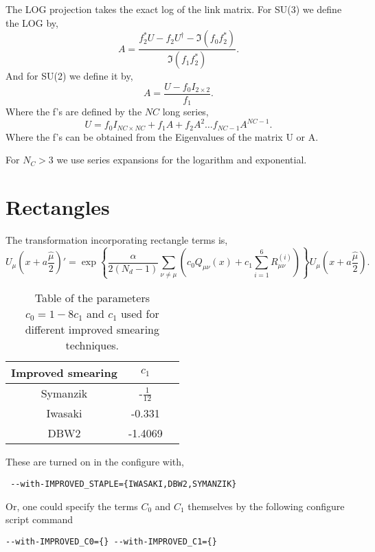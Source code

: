 \documentclass[12pt]{article}
\newcommand{\UMP}{\mbox{$U_\mu\left(x+a\frac{\hat\mu}{2}\right)$}}
\begin{document}
The LOG projection takes the exact log of the link matrix. For SU(3) we define the LOG by,
\begin{equation}\label{chap5:eq:exactlog}
A=\frac{f_2^*U-f_2U^{\dagger}-\Im{\left(f_0 f_2^*\right)}}{\Im{\left(f_1 f_2^*\right)}}.
\end{equation}
And for SU(2) we define it by,
\begin{equation}
A=\frac{U - f_0 I_{2\times2}}{f_1}.
\end{equation}
Where the f's are defined by the $NC$ long series,
\begin{equation}
 U = f_0 I_{NC\times NC} + f_1 A + f_2 A^2 \dots f_{NC-1} A^{NC-1}.
\end{equation}
Where the f's can be obtained from the Eigenvalues of the matrix U or A.

For $N_C > 3$ we use series expansions for the logarithm and exponential.

\section{Rectangles}\label{sec:rec}

The transformation incorporating rectangle terms is,
\begin{equation}
\UMP'=\exp\left\{\frac{\alpha}{2(N_d-1)}\sum_{\nu\neq\mu}\left(c_0 Q_{\mu\nu}(x)
+c_1\sum_{i=1}^{6} R^{(i)}_{\mu\nu}\right) \right\}\UMP.
\end{equation}

\begin{table}[h]
\begin{center}
\begin{tabular}{|c|c|c|}
\hline
Improved smearing & $c_1$ \\
\hline
\rule{0pt}{2.6ex}
Symanzik & -$\frac{1}{12}$ \\
Iwasaki & -0.331 \\
DBW2 & -1.4069 \\
\hline
\end{tabular}
\caption{Table of the parameters $c_0=1-8c_1$ and $c_1$ used for different
improved smearing techniques.}\label{chap3:tab:smearing_params}
\end{center}
\end{table}

These are turned on in the configure with,
\begin{verbatim}
 --with-IMPROVED_STAPLE={IWASAKI,DBW2,SYMANZIK}
\end{verbatim}

Or, one could specify the terms $C_0$ and $C_1$ themselves by the following configure script command
\begin{verbatim}
--with-IMPROVED_C0={} --with-IMPROVED_C1={}
\end{verbatim}
\end{document}
